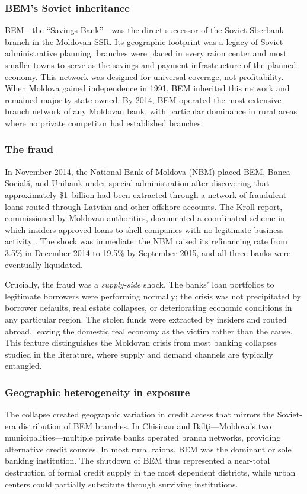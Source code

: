 \documentclass[12pt]{article}
\begin{document}
\subsubsection*{BEM's Soviet inheritance} BEM---the ``Savings Bank''---was the direct successor of the Soviet Sberbank branch in the Moldovan SSR. Its geographic footprint was a legacy of Soviet administrative planning: branches were placed in every raion center and most smaller towns to serve as the savings and payment infrastructure of the planned economy. This network was designed for universal coverage, not profitability. When Moldova gained independence in 1991, BEM inherited this network and remained majority state-owned. By 2014, BEM operated the most extensive branch network of any Moldovan bank, with particular dominance in rural areas where no private competitor had established branches.

\subsubsection*{The fraud} In November 2014, the National Bank of Moldova (NBM) placed BEM, Banca Social\u{a}, and Unibank under special administration after discovering that approximately \$1~billion had been extracted through a network of fraudulent loans routed through Latvian and other offshore accounts. The Kroll report, commissioned by Moldovan authorities, documented a coordinated scheme in which insiders approved loans to shell companies with no legitimate business activity \citep{kroll2015report}. The shock was immediate: the NBM raised its refinancing rate from 3.5\% in December 2014 to 19.5\% by September 2015, and all three banks were eventually liquidated.

Crucially, the fraud was a \emph{supply-side} shock. The banks' loan portfolios to legitimate borrowers were performing normally; the crisis was not precipitated by borrower defaults, real estate collapses, or deteriorating economic conditions in any particular region. The stolen funds were extracted by insiders and routed abroad, leaving the domestic real economy as the victim rather than the cause. This feature distinguishes the Moldovan crisis from most banking collapses studied in the literature, where supply and demand channels are typically entangled.

\subsubsection*{Geographic heterogeneity in exposure} The collapse created geographic variation in credit access that mirrors the Soviet-era distribution of BEM branches. In Chisinau and B\u{a}l\c{t}i---Moldova's two municipalities---multiple private banks operated branch networks, providing alternative credit sources. In most rural raions, BEM was the dominant or sole banking institution. The shutdown of BEM thus represented a near-total destruction of formal credit supply in the most dependent districts, while urban centers could partially substitute through surviving institutions.
\end{document}
